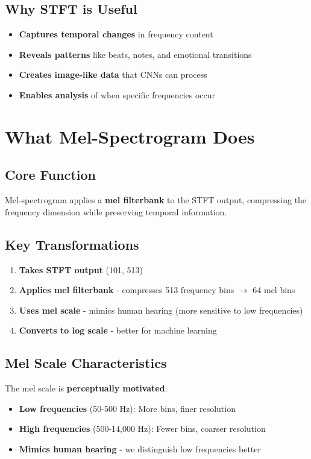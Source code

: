 \documentclass[12pt]{article}
\begin{document}
\subsection{Why STFT is Useful}
\begin{itemize}
    \item \textbf{Captures temporal changes} in frequency content
    \item \textbf{Reveals patterns} like beats, notes, and emotional transitions
    \item \textbf{Creates image-like data} that CNNs can process
    \item \textbf{Enables analysis} of when specific frequencies occur
\end{itemize}

\section{What Mel-Spectrogram Does}

\subsection{Core Function}
Mel-spectrogram applies a \textbf{mel filterbank} to the STFT output, compressing the frequency dimension while preserving temporal information.

\subsection{Key Transformations}
\begin{enumerate}
    \item \textbf{Takes STFT output} (101, 513)
    \item \textbf{Applies mel filterbank} - compresses 513 frequency bins $\rightarrow$ 64 mel bins
    \item \textbf{Uses mel scale} - mimics human hearing (more sensitive to low frequencies)
    \item \textbf{Converts to log scale} - better for machine learning
\end{enumerate}

\subsection{Mel Scale Characteristics}
The mel scale is \textbf{perceptually motivated}:
\begin{itemize}
    \item \textbf{Low frequencies} (50-500 Hz): More bins, finer resolution
    \item \textbf{High frequencies} (500-14,000 Hz): Fewer bins, coarser resolution
    \item \textbf{Mimics human hearing} - we distinguish low frequencies better
\end{itemize}
\end{document}

